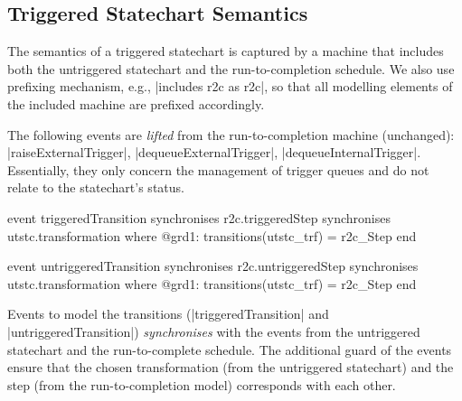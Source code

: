 \subsection{Triggered Statechart Semantics}
\label{sec:tstc-semantics}
The semantics of a triggered statechart is captured by a machine that includes both the untriggered statechart and the run-to-completion schedule. We also use prefixing mechanism, e.g., |includes r2c as r2c|, so that all modelling elements of the included machine are prefixed accordingly.

The following events are \emph{lifted} from the run-to-completion machine (unchanged): |raiseExternalTrigger|, |dequeueExternalTrigger|, |dequeueInternalTrigger|. Essentially, they only concern the management of trigger queues and do not relate to the statechart's status.
\begin{center}
    \begin{minipage}{0.48\textwidth}
\begin{EventBcode}
event triggeredTransition
synchronises r2c.triggeredStep
synchronises utstc.transformation
where 
	@grd1: transitions(utstc_trf) = r2c_Step 
end
\end{EventBcode}
    \end{minipage}
    \hfill
    \begin{minipage}{0.48\textwidth}
\begin{EventBcode}
event untriggeredTransition
synchronises r2c.untriggeredStep
synchronises utstc.transformation
where 
	@grd1: transitions(utstc_trf) = r2c_Step 
end    
\end{EventBcode}
    \end{minipage}
\end{center}
Events to model the transitions (|triggeredTransition| and |untriggeredTransition|) \emph{synchronises} with the events from the untriggered statechart and the run-to-complete schedule. The additional guard of the events ensure that the chosen transformation (from the untriggered statechart) and the step (from the run-to-completion model) corresponds with each other.

